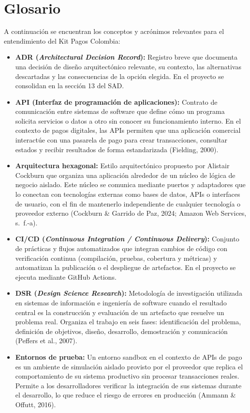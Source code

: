 \section{Glosario}

A continuación se encuentran los conceptos y acrónimos relevantes para el entendimiento del Kit Pagos Colombia:

\begin{itemize}
  \item \textbf{ADR (\textit{Architectural Decision Record}):} Registro breve que documenta una decisión de diseño arquitectónico relevante, su contexto, las alternativas descartadas y las consecuencias de la opción elegida. En el proyecto se consolidan en la sección 13 del SAD.
  \item \textbf{API (Interfaz de programación de aplicaciones):} Contrato de comunicación entre sistemas de software que define cómo un programa solicita servicios o datos a otro sin conocer su funcionamiento interno. En el contexto de pagos digitales, las APIs permiten que una aplicación comercial interactúe con una pasarela de pago para crear transacciones, consultar estados y recibir resultados de forma estandarizada (Fielding, 2000).
  \item \textbf{Arquitectura hexagonal:} Estilo arquitectónico propuesto por Alistair Cockburn que organiza una aplicación alrededor de un núcleo de lógica de negocio aislado. Este núcleo se comunica mediante puertos y adaptadores que lo conectan con tecnologías externas como bases de datos, APIs o interfaces de usuario, con el fin de mantenerlo independiente de cualquier tecnología o proveedor externo (Cockburn \& Garrido de Paz, 2024; Amazon Web Services, s.~f.-a).
  \item \textbf{CI/CD (\textit{Continuous Integration / Continuous Delivery}):} Conjunto de prácticas y flujos automatizados que integran cambios de código con verificación continua (compilación, pruebas, cobertura y métricas) y automatizan la publicación o el despliegue de artefactos. En el proyecto se ejecuta mediante GitHub Actions.
  \item \textbf{DSR (\textit{Design Science Research}):} Metodología de investigación utilizada en sistemas de información e ingeniería de software cuando el resultado central es la construcción y evaluación de un artefacto que resuelve un problema real. Organiza el trabajo en seis fases: identificación del problema, definición de objetivos, diseño, desarrollo, demostración y comunicación (Peffers et al., 2007).
  \item \textbf{Entornos de prueba:} Un entorno sandbox en el contexto de APIs de pago es un ambiente de simulación aislado provisto por el proveedor que replica el comportamiento de su sistema productivo sin procesar transacciones reales. Permite a los desarrolladores verificar la integración de sus sistemas durante el desarrollo, lo que reduce el riesgo de errores en producción (Ammann \& Offutt, 2016).

\end{itemize}
